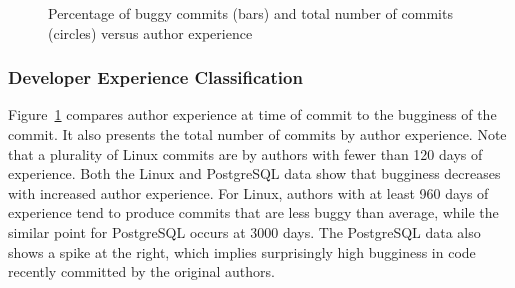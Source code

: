 \begin{figure}[tbh]
\centering
{}
\caption{\label{fig-bugginess-experience}Percentage of buggy commits (bars) and
  total number of commits (circles) versus author experience}
\end{figure}

\subsubsection{Developer Experience Classification}
\label{sec-dev-exp}

Figure~\ref{fig-bugginess-experience} compares author experience at time of
commit to the bugginess of the commit. It also presents the total number of
commits by author experience. Note that a plurality of Linux commits are by
authors with fewer than 120 days of experience.  Both the Linux and PostgreSQL
data show that bugginess decreases with increased author experience. For Linux,
authors with at least 960 days of experience tend to produce commits that are
less buggy than average, while the similar point for PostgreSQL occurs at 3000
days.  The PostgreSQL data also shows a spike at the right, which implies
surprisingly high bugginess in code recently committed by the original authors.

